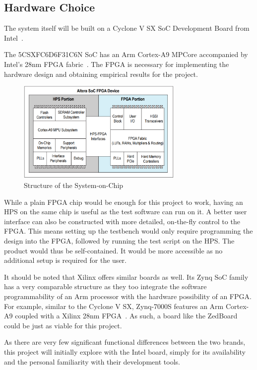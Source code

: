 \subsection{Hardware Choice}
The system itself will be built on a Cyclone V SX SoC Development Board from
Intel~\cite{Intel1}.

The 5CSXFC6D6F31C6N SoC has an Arm Cortex-A9 MPCore accompanied by Intel's 28nm
FPGA fabric~\cite{Altera1}.
The FPGA is necessary for implementing the hardware design and obtaining
empirical results for the project.

\begin{figure}[H]
  \centering
  \includegraphics[width=8cm]{img/SoCStructure}
  \caption{Structure of the System-on-Chip}
  \label{SoCStructure}
\end{figure}

While a plain FPGA chip would be enough for this project to work,
having an HPS on the same chip is useful as the test software can run on it.
A better user interface can also be constructed with more detailed,
on-the-fly control to the FPGA.
This means setting up the testbench would only require programming the design
into the FPGA, followed by running the test script on the HPS.
The product would thus be self-contained.
It would be more accessible as no additional setup is required for the user.

It should be noted that Xilinx offers similar boards as well.
Its Zynq SoC family has a very comparable structure as they too integrate the
software programmability of an Arm processor with the hardware possibility of
an FPGA.
For example, similar to the Cyclone V SX, Zynq-7000S features an Arm Cortex-A9
coupled with a Xilinx 28nm FPGA~\cite{Xilinx1}.
As such, a board like the ZedBoard~\cite{Xilinx2} could be just as viable for
this project.

As there are very few significant functional differences between the two brands,
this project will initially explore with the Intel board, simply for its
availability and the personal familiarity with their development tools.

